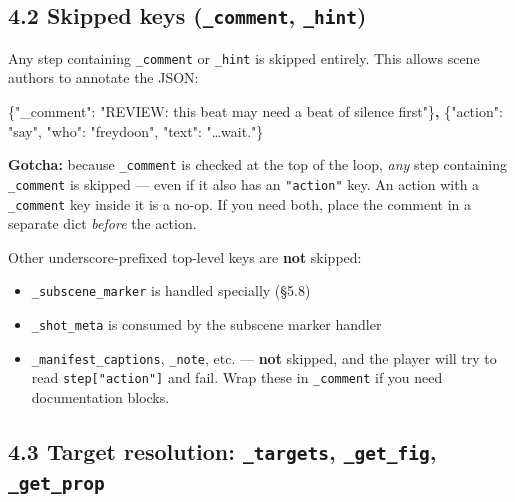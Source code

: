 \documentclass[
  11pt,
]{book}
\newenvironment{Shaded}{}{}
\newcommand{\DataTypeTok}[1]{\textcolor[rgb]{0.56,0.13,0.00}{#1}}
\newcommand{\ErrorTok}[1]{\textcolor[rgb]{1.00,0.00,0.00}{\textbf{#1}}}
\newcommand{\FunctionTok}[1]{\textcolor[rgb]{0.02,0.16,0.49}{#1}}
\newcommand{\StringTok}[1]{\textcolor[rgb]{0.25,0.44,0.63}{#1}}
\providecommand{\tightlist}{%
  \setlength{\itemsep}{0pt}\setlength{\parskip}{0pt}}
\begin{document}
\subsection{\texorpdfstring{4.2 Skipped keys (\texttt{\_comment},
\texttt{\_hint})}{4.2 Skipped keys (\_comment, \_hint)}}\label{skipped-keys-_comment-_hint}

Any step containing \texttt{\_comment} or \texttt{\_hint} is skipped
entirely. This allows scene authors to annotate the JSON:

\begin{Shaded}
\begin{Highlighting}[]
\FunctionTok{\{}\DataTypeTok{"\_comment"}\FunctionTok{:} \StringTok{"REVIEW: this beat may need a beat of silence first"}\FunctionTok{\}}\ErrorTok{,}
\FunctionTok{\{}\DataTypeTok{"action"}\FunctionTok{:} \StringTok{"say"}\FunctionTok{,} \DataTypeTok{"who"}\FunctionTok{:} \StringTok{"freydoon"}\FunctionTok{,} \DataTypeTok{"text"}\FunctionTok{:} \StringTok{"…wait."}\FunctionTok{\}}
\end{Highlighting}
\end{Shaded}

\textbf{Gotcha:} because \texttt{\_comment} is checked at the top of the
loop, \emph{any} step containing \texttt{\_comment} is skipped --- even
if it also has an \texttt{"action"} key. An action with a
\texttt{\_comment} key inside it is a no-op. If you need both, place the
comment in a separate dict \emph{before} the action.

Other underscore-prefixed top-level keys are \textbf{not} skipped:

\begin{itemize}
\tightlist
\item
  \texttt{\_subscene\_marker} is handled specially (§5.8)
\item
  \texttt{\_shot\_meta} is consumed by the subscene marker handler
\item
  \texttt{\_manifest\_captions}, \texttt{\_note}, etc. --- \textbf{not}
  skipped, and the player will try to read \texttt{step{[}"action"{]}}
  and fail. Wrap these in \texttt{\_comment} if you need documentation
  blocks.
\end{itemize}

\subsection{\texorpdfstring{4.3 Target resolution: \texttt{\_targets},
\texttt{\_get\_fig},
\texttt{\_get\_prop}}{4.3 Target resolution: \_targets, \_get\_fig, \_get\_prop}}\label{target-resolution-_targets-_get_fig-_get_prop}
\end{document}
